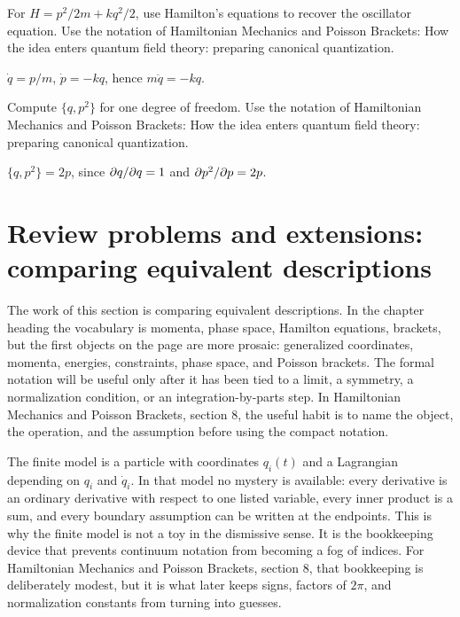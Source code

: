 \begin{exercise}
For \(H=p^2/2m+kq^2/2\), use Hamilton's equations to recover the oscillator equation.  Use the notation of Hamiltonian Mechanics and Poisson Brackets: How the idea enters quantum field theory: preparing canonical quantization.
\begin{answer}
\(\dot q=p/m\), \(\dot p=-kq\), hence \(m\ddot q=-kq\).
\end{answer}
\end{exercise}

\begin{exercise}
Compute \(\{q,p^2\}\) for one degree of freedom.  Use the notation of Hamiltonian Mechanics and Poisson Brackets: How the idea enters quantum field theory: preparing canonical quantization.
\begin{answer}
\(\{q,p^2\}=2p\), since \(\partial q/\partial q=1\) and \(\partial p^2/\partial p=2p\).
\end{answer}
\end{exercise}



\section{Review problems and extensions: comparing equivalent descriptions}

The work of this section is comparing equivalent descriptions.  In the chapter heading the vocabulary is momenta, phase space, Hamilton equations, brackets, but the first objects on the page are more prosaic: generalized coordinates, momenta, energies, constraints, phase space, and Poisson brackets.  The formal notation will be useful only after it has been tied to a limit, a symmetry, a normalization condition, or an integration-by-parts step.  In Hamiltonian Mechanics and Poisson Brackets, section 8, the useful habit is to name the object, the operation, and the assumption before using the compact notation.

The finite model is a particle with coordinates \(q_i(t)\) and a Lagrangian depending on \(q_i\) and \(\dot q_i\).  In that model no mystery is available: every derivative is an ordinary derivative with respect to one listed variable, every inner product is a sum, and every boundary assumption can be written at the endpoints.  This is why the finite model is not a toy in the dismissive sense.  It is the bookkeeping device that prevents continuum notation from becoming a fog of indices.  For Hamiltonian Mechanics and Poisson Brackets, section 8, that bookkeeping is deliberately modest, but it is what later keeps signs, factors of \(2\pi\), and normalization constants from turning into guesses.

